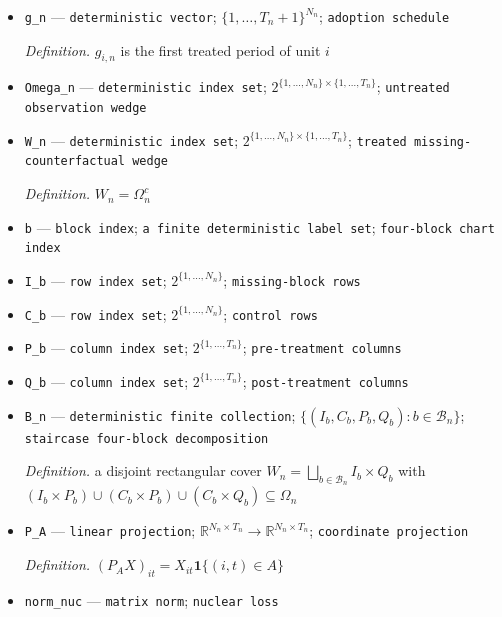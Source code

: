 \documentclass{article}
\begin{document}
\begin{itemize}
  \item \texttt{g\_\allowbreak{}n} --- \texttt{deterministic vector}; \(\{1,\ldots,T_n+1\}^{N_n}\); \texttt{adoption schedule}
  \par\smallskip\noindent\emph{Definition.} \(g_{i,n}\) is the first treated period of unit \(i\)
  \item \texttt{Omega\_\allowbreak{}n} --- \texttt{deterministic index set}; \(2^{\{1,\ldots,N_n\}\times\{1,\ldots,T_n\}}\); \texttt{untreated observation wedge}
  \item \texttt{W\_\allowbreak{}n} --- \texttt{deterministic index set}; \(2^{\{1,\ldots,N_n\}\times\{1,\ldots,T_n\}}\); \texttt{treated missing-\allowbreak{}counterfactual wedge}
  \par\smallskip\noindent\emph{Definition.} \(W_n=\Omega_n^{c}\)
  \item \texttt{b} --- \texttt{block index}; \texttt{a finite deterministic label set}; \texttt{four-\allowbreak{}block chart index}
  \item \texttt{I\_\allowbreak{}b} --- \texttt{row index set}; \(2^{\{1,\ldots,N_n\}}\); \texttt{missing-\allowbreak{}block rows}
  \item \texttt{C\_\allowbreak{}b} --- \texttt{row index set}; \(2^{\{1,\ldots,N_n\}}\); \texttt{control rows}
  \item \texttt{P\_\allowbreak{}b} --- \texttt{column index set}; \(2^{\{1,\ldots,T_n\}}\); \texttt{pre-\allowbreak{}treatment columns}
  \item \texttt{Q\_\allowbreak{}b} --- \texttt{column index set}; \(2^{\{1,\ldots,T_n\}}\); \texttt{post-\allowbreak{}treatment columns}
  \item \texttt{B\_\allowbreak{}n} --- \texttt{deterministic finite collection}; \(\{(I_b,C_b,P_b,Q_b):b\in\mathcal B_n\}\); \texttt{staircase four-\allowbreak{}block decomposition}
  \par\smallskip\noindent\emph{Definition.} a disjoint rectangular cover \(W_n=\bigsqcup_{b\in\mathcal B_n}I_b\times Q_b\) with \((I_b\times P_b)\cup(C_b\times P_b)\cup(C_b\times Q_b)\subseteq\Omega_n\)
  \item \texttt{P\_\allowbreak{}A} --- \texttt{linear projection}; \(\mathbb R^{N_n\times T_n}\to\mathbb R^{N_n\times T_n}\); \texttt{coordinate projection}
  \par\smallskip\noindent\emph{Definition.} \((P_A X)_{it}=X_{it}\mathbf 1\{(i,t)\in A\}\)
  \item \texttt{norm\_\allowbreak{}nuc} --- \texttt{matrix norm}; \texttt{nuclear loss}

\end{itemize}
\end{document}
